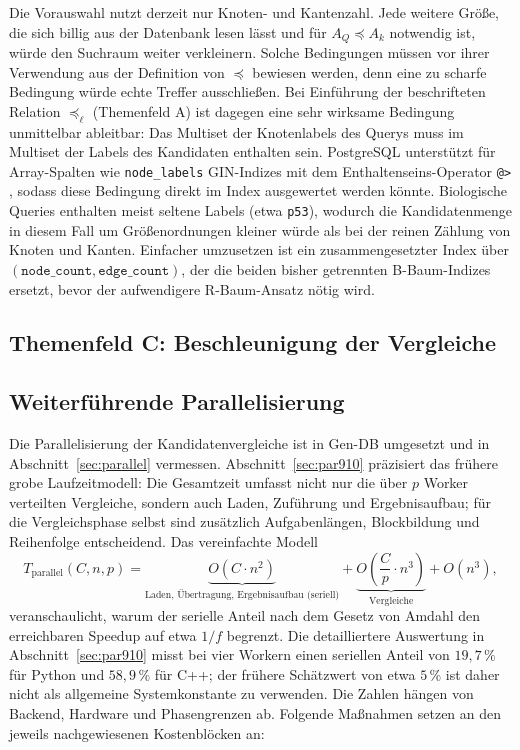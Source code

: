\documentclass[a4paper,12pt, twoside]{report}
\theoremstyle{definition}
\begin{document}
Die Vorauswahl nutzt derzeit nur Knoten- und Kantenzahl. Jede weitere Größe, die sich billig aus der Datenbank lesen lässt und für $A_Q\preceq A_k$ notwendig ist, würde den Suchraum weiter verkleinern. Solche Bedingungen müssen vor ihrer Verwendung aus der Definition von $\preceq$ bewiesen werden, denn eine zu scharfe Bedingung würde echte Treffer ausschließen. Bei Einführung der beschrifteten Relation $\preceq_\ell$ (Themenfeld A) ist dagegen eine sehr wirksame Bedingung unmittelbar ableitbar: Das Multiset der Knotenlabels des Querys muss im Multiset der Labels des Kandidaten enthalten sein. PostgreSQL unterstützt für Array-Spalten wie \texttt{node\_labels} GIN-Indizes mit dem Enthaltenseins-Operator \texttt{@>} \cite{postgresql}, sodass diese Bedingung direkt im Index ausgewertet werden könnte. Biologische Queries enthalten meist seltene Labels (etwa \texttt{p53}), wodurch die Kandidatenmenge in diesem Fall um Größenordnungen kleiner würde als bei der reinen Zählung von Knoten und Kanten. Einfacher umzusetzen ist ein zusammengesetzter Index über $(\texttt{node\_count},\texttt{edge\_count})$, der die beiden bisher getrennten B-Baum-Indizes ersetzt, bevor der aufwendigere R-Baum-Ansatz nötig wird.

\subsection*{Themenfeld C: Beschleunigung der Vergleiche}

\subsection{Weiterführende Parallelisierung}
\label{sec:weiter_parallel}

Die Parallelisierung der Kandidatenvergleiche ist in Gen-DB umgesetzt und in Abschnitt~\ref{sec:parallel} vermessen. Abschnitt~\ref{sec:par910} präzisiert das frühere grobe Laufzeitmodell: Die Gesamtzeit umfasst nicht nur die über $p$ Worker verteilten Vergleiche, sondern auch Laden, Zuführung und Ergebnisaufbau; für die Vergleichsphase selbst sind zusätzlich Aufgabenlängen, Blockbildung und Reihenfolge entscheidend. Das vereinfachte Modell
\[
T_{\text{parallel}}(C,n,p) = \underbrace{O(C\cdot n^2)}_{\text{Laden, Übertragung, Ergebnisaufbau (seriell)}} + \underbrace{O\!\left(\frac{C}{p}\cdot n^3\right)}_{\text{Vergleiche}} + O(n^3),
\]
veranschaulicht, warum der serielle Anteil nach dem Gesetz von Amdahl \cite{amdahl1967} den erreichbaren Speedup auf etwa $1/f$ begrenzt. Die detailliertere Auswertung in Abschnitt~\ref{sec:par910} misst bei vier Workern einen seriellen Anteil von $19{,}7\,\%$ für Python und $58{,}9\,\%$ für C++; der frühere Schätzwert von etwa $5\,\%$ ist daher nicht als allgemeine Systemkonstante zu verwenden. Die Zahlen hängen von Backend, Hardware und Phasengrenzen ab. Folgende Maßnahmen setzen an den jeweils nachgewiesenen Kostenblöcken an:
\end{document}
